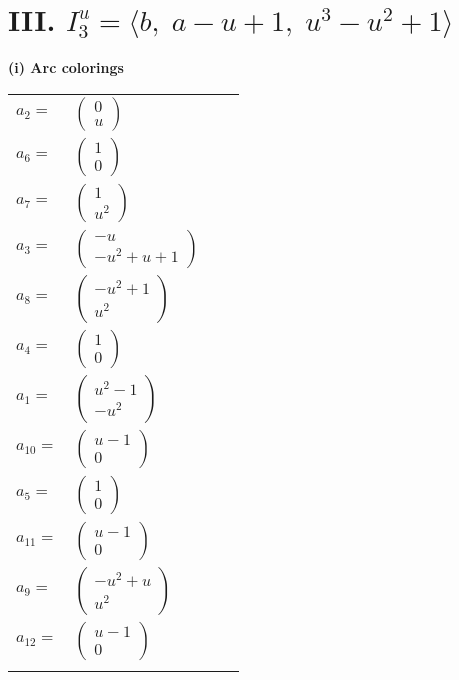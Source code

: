 \documentclass[1p]{elsarticle_modified}
\theoremstyle{definition}
\begin{document}
\centering \section*{III. $I^u_{3}= \langle b,\;a- u+1,\;u^3- u^2+1 \rangle$}
\flushleft \textbf{(i) Arc colorings}\\
\begin{tabular}{m{7pt} m{180pt} m{7pt} m{180pt} }
\flushright $a_{2}=$&$\begin{pmatrix}0\\u\end{pmatrix}$ \\
\flushright $a_{6}=$&$\begin{pmatrix}1\\0\end{pmatrix}$ \\
\flushright $a_{7}=$&$\begin{pmatrix}1\\u^2\end{pmatrix}$ \\
\flushright $a_{3}=$&$\begin{pmatrix}- u\\- u^2+u+1\end{pmatrix}$ \\
\flushright $a_{8}=$&$\begin{pmatrix}- u^2+1\\u^2\end{pmatrix}$ \\
\flushright $a_{4}=$&$\begin{pmatrix}1\\0\end{pmatrix}$ \\
\flushright $a_{1}=$&$\begin{pmatrix}u^2-1\\- u^2\end{pmatrix}$ \\
\flushright $a_{10}=$&$\begin{pmatrix}u-1\\0\end{pmatrix}$ \\
\flushright $a_{5}=$&$\begin{pmatrix}1\\0\end{pmatrix}$ \\
\flushright $a_{11}=$&$\begin{pmatrix}u-1\\0\end{pmatrix}$ \\
\flushright $a_{9}=$&$\begin{pmatrix}- u^2+u\\u^2\end{pmatrix}$ \\
\flushright $a_{12}=$&$\begin{pmatrix}u-1\\0\end{pmatrix}$\\&\end{tabular}
\end{document}
